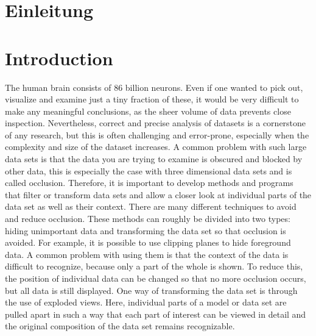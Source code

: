{\chapter{Einleitung}}
{\chapter{Introduction}}

\label{sec:introduction}

The human brain consists of 86 billion neurons. Even if one wanted to pick out, visualize and examine just a tiny fraction of these, it would be very difficult to make any meaningful conclusions, as the sheer volume of data prevents close inspection. %
Nevertheless, correct and precise analysis of datasets is a cornerstone of any research, but this is often challenging and error-prone, especially when the complexity and size of the dataset increases.
A common problem with such large data sets is that the data you are trying to examine is obscured and blocked by other data, this is especially the case with three dimensional data sets and is called occlusion.
Therefore, it is important to develop methods and programs that filter or transform data sets and allow a closer look at individual parts of the data set as well as their context. 
There are many different techniques to avoid and reduce occlusion. These methods can roughly be divided into two types: hiding unimportant data and transforming the data set so that occlusion is avoided.
For example, it is possible to use clipping planes to hide foreground data. A common problem with using them is that the context of the data is difficult to recognize, because only a part of the whole is shown. 
To reduce this, the position of individual data can be changed so that no more occlusion occurs, but all data is still displayed. 
One way of transforming the data set is through the use of exploded views. Here, individual parts of a model or data set are pulled apart in such a way that each part of interest can be viewed in detail and the original composition of the data set remains recognizable. 

